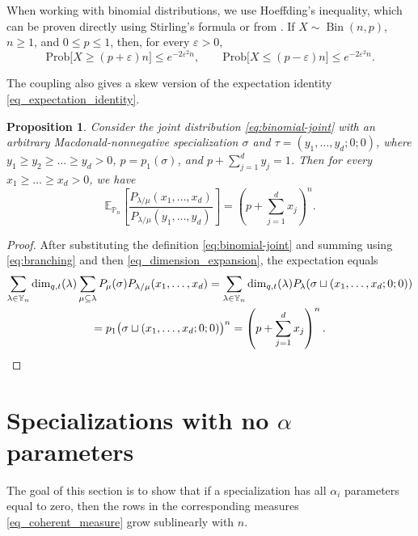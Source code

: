 \documentclass[11pt,reqno]{amsart}
\newtheorem{proposition}[theorem]{Proposition}
\theoremstyle{definition}
\theoremstyle{remark}
\numberwithin{equation}{section}
\newcommand{\Y}{\mathbb Y}
\newcommand{\Prob}{\mathbb P}
\newcommand{\E}{\mathbb E}
\newcommand{\ddim}{\operatorname{dim}_{q,t}}
\DeclareMathOperator{\Bin}{Bin}
\begin{document}
When working with binomial distributions, we use Hoeffding's inequality, which can be proven directly using Stirling's formula or from \cite[Theorem~1]{Hoe63}. If $X\sim\Bin(n,p)$,
$n\ge1$, and $0\le p\le1$, then, for every $\varepsilon>0$,
\begin{equation}\label{eq:binomial-tail}
 \mathrm{Prob} \bigl[X\ge(p+\varepsilon)n\bigr]\le e^{-2\varepsilon^2n},\qquad
 \mathrm{Prob} \bigl[X\le(p-\varepsilon)n\bigr]\le e^{-2\varepsilon^2n}.
\end{equation}


The coupling also gives a skew version of the expectation identity
\eqref{eq_expectation_identity}. 


\begin{proposition}
Consider the joint distribution \eqref{eq:binomial-joint} with an arbitrary Macdonald-nonnegative specialization $\sigma$ and
$\tau=(y_1,\ldots,y_d;0;0)$, where $y_1\ge y_2\ge \dots \ge y_d>0$, $p=p_1(\sigma)$, and $p+\sum_{j=1}^dy_j=1$.
Then for every $x_1\ge \dots\ge x_d>0$, we have
\begin{equation}\label{eq:skew-tilted-expectation}
 \E_{\Prob_n}\left[
   \frac{P_{\lambda/\mu}(x_1,\dots,x_d)}{P_{\lambda/\mu}(y_1,\dots,y_d)}
 \right]
 =\left(p+\sum_{j=1}^dx_j\right)^n.
\end{equation}
\end{proposition}
\begin{proof}
After substituting the definition \eqref{eq:binomial-joint} and summing using \eqref{eq:branching} and then \eqref{eq_dimension_expansion}, the expectation equals
\begin{multline*}
 \sum_{\lambda\in\Y_n}\ddim(\lambda)
 \sum_{\mu\subseteq\lambda}P_\mu(\sigma)P_{\lambda/\mu}(x_1,\dots,x_d)
 =\sum_{\lambda\in\Y_n}\ddim(\lambda)P_\lambda(\sigma\sqcup(x_1,\dots,x_d;0;0))\\= p_1\bigl(\sigma\sqcup(x_1,\dots,x_d;0;0)\bigr)^n =\left(p+\sum_{j=1}^dx_j\right)^n. \qedhere
\end{multline*}
\end{proof}

\section{Specializations with no $\alpha$ parameters}\label{Section_noalpha}

The goal of this section is to show that if a specialization has all $\alpha_i$ parameters equal to zero, then the rows in the corresponding measures \eqref{eq_coherent_measure} grow sublinearly with $n$.
\end{document}
